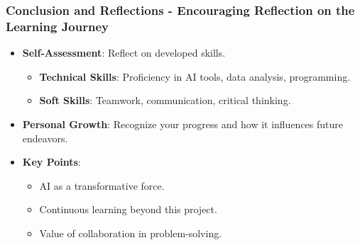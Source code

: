 \documentclass{beamer}
\begin{document}
\begin{frame}[fragile]
    \frametitle{Conclusion and Reflections - Encouraging Reflection on the Learning Journey}
    
    \begin{itemize}
        \item \textbf{Self-Assessment}: Reflect on developed skills.
        \begin{itemize}
            \item \textbf{Technical Skills}: Proficiency in AI tools, data analysis, programming.
            \item \textbf{Soft Skills}: Teamwork, communication, critical thinking.
        \end{itemize}
        
        \item \textbf{Personal Growth}: Recognize your progress and how it influences future endeavors.
        
        \item \textbf{Key Points}:
        \begin{itemize}
            \item AI as a transformative force.
            \item Continuous learning beyond this project.
            \item Value of collaboration in problem-solving.
        \end{itemize}
    \end{itemize}
\end{frame}
\end{document}
